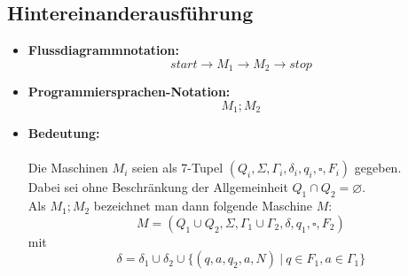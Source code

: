\documentclass{article}
\begin{document}
		\subsection{Hintereinanderausführung}
		\begin{itemize}
			\item \textbf{Flussdiagrammnotation:}
			\[start \rightarrow M_1 \rightarrow M_2 \rightarrow stop\]
			\item \textbf{Programmiersprachen-Notation:}
			\[M_1;M_2\]
			\item \textbf{Bedeutung:} \\
			\\
			Die Maschinen $M_i$ seien als 7-Tupel $(Q_i, \Sigma, \Gamma_i, \delta_i, q_i, \square, F_i)$ gegeben. \\
			Dabei sei ohne Beschränkung der Allgemeinheit $Q_1 \cap Q_2 = \varnothing$. \\
			Als $M_1;M_2$ bezeichnet man dann folgende Maschine $M$: \\
			\[M = (Q_1 \cup Q_2, \Sigma, \Gamma_1 \cup \Gamma_2, \delta, q_1, \square, F_2)\] mit
			\[\delta = \delta_1 \cup \delta_2 \cup \{(q,a,q_2,a,N) \: | \: q \in F_1, a \in \Gamma_1\}\]
		\end{itemize}
\end{document}
